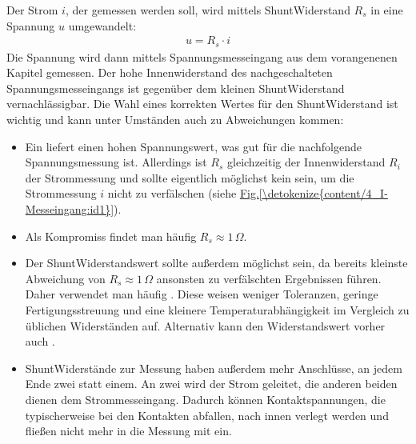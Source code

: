 \documentclass[letterpaper,10pt,english]{jupyterBook}
\begin{document}
\sphinxAtStartPar
Der Strom \(i\), der gemessen werden soll, wird mittels Shunt\sphinxhyphen{}Widerstand \(R_s\) in eine Spannung \(u\) umgewandelt:
\begin{equation*}
\begin{split}u = R_s \cdot i\end{split}
\end{equation*}
\sphinxAtStartPar
Die Spannung wird dann mittels Spannungsmesseingang aus dem vorangenenen Kapitel gemessen. Der hohe Innenwiderstand des nachgeschalteten Spannungsmesseingangs ist gegenüber dem kleinen Shunt\sphinxhyphen{}Widerstand vernachlässigbar.
Die Wahl eines korrekten Wertes für den Shunt\sphinxhyphen{}Widerstand ist wichtig und kann unter Umständen auch zu Abweichungen kommen:
\begin{itemize}
\item {} 
\sphinxAtStartPar
Ein  liefert einen hohen Spannungswert, was gut für die nachfolgende Spannungsmessung ist. Allerdings ist \(R_s\) gleichzeitig der Innenwiderstand \(R_i\) der Strommessung und sollte eigentlich möglichst kein sein, um die Strommessung \(i\) nicht zu verfälschen (siehe \hyperref[\detokenize{content/4_I-Messeingang:id1}]{Fig.\@ \ref{\detokenize{content/4_I-Messeingang:id1}}}).

\item {} 
\sphinxAtStartPar
Als Kompromiss findet man häufig \(R_s \approx 1\,\Omega\).

\item {} 
\sphinxAtStartPar
Der Shunt\sphinxhyphen{}Widerstandswert sollte außerdem möglichst  sein, da bereits kleinste Abweichung von \(R_s \approx 1\,\Omega\) ansonsten zu verfälschten Ergebnissen führen. Daher verwendet man häufig . Diese weisen weniger Toleranzen, geringe Fertigungsstreuung und eine kleinere Temperaturabhängigkeit im Vergleich zu üblichen Widerständen auf. Alternativ kann den Widerstandswert vorher auch .

\item {} 
\sphinxAtStartPar
Shunt\sphinxhyphen{}Widerstände zur Messung  haben außerdem mehr Anschlüsse, an jedem Ende zwei statt einem. An zwei wird der Strom geleitet, die anderen beiden dienen dem Strommesseingang. Dadurch können Kontaktspannungen, die typischerweise bei den Kontakten abfallen, nach innen verlegt werden und fließen nicht mehr in die Messung mit ein.

\end{itemize}
\end{document}
